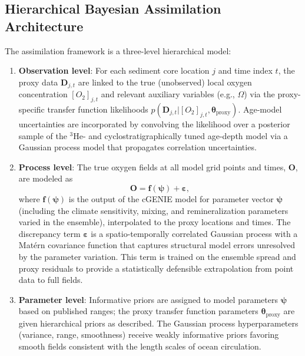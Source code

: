 \documentclass{article}
\begin{document}
\subsection{Hierarchical Bayesian Assimilation Architecture}

The assimilation framework is a three-level hierarchical model:

\begin{enumerate}
    \item \textbf{Observation level}: For each sediment core location $j$ and time index $t$, the proxy data $\mathbf{D}_{j,t}$ are linked to the true (unobserved) local oxygen concentration $[O_2]_{j,t}$ and relevant auxiliary variables (e.g., $\Omega$) via the proxy-specific transfer function likelihoods $p(\mathbf{D}_{j,t} | [O_2]_{j,t}, \boldsymbol{\theta}_{\text{proxy}})$.
    Age-model uncertainties are incorporated by convolving the likelihood over a posterior sample of the $^{3}$He- and cyclostratigraphically tuned age-depth model via a Gaussian process model that propagates correlation uncertainties.
    
    \item \textbf{Process level}: The true oxygen fields at all model grid points and times, $\mathbf{O}$, are modeled as
    \[
    \mathbf{O} = \mathbf{f}(\boldsymbol{\psi}) + \boldsymbol{\varepsilon},
    \]
    where $\mathbf{f}(\boldsymbol{\psi})$ is the output of the cGENIE model for parameter vector $\boldsymbol{\psi}$ (including the climate sensitivity, mixing, and remineralization parameters varied in the ensemble), interpolated to the proxy locations and times.
    The discrepancy term $\boldsymbol{\varepsilon}$ is a spatio-temporally correlated Gaussian process with a Matérn covariance function that captures structural model errors unresolved by the parameter variation.
    This term is trained on the ensemble spread and proxy residuals to provide a statistically defensible extrapolation from point data to full fields.
    
    \item \textbf{Parameter level}: Informative priors are assigned to model parameters $\boldsymbol{\psi}$ based on published ranges; the proxy transfer function parameters $\boldsymbol{\theta}_{\text{proxy}}$ are given hierarchical priors as described.
    The Gaussian process hyperparameters (variance, range, smoothness) receive weakly informative priors favoring smooth fields consistent with the length scales of ocean circulation.
\end{enumerate}
\end{document}
